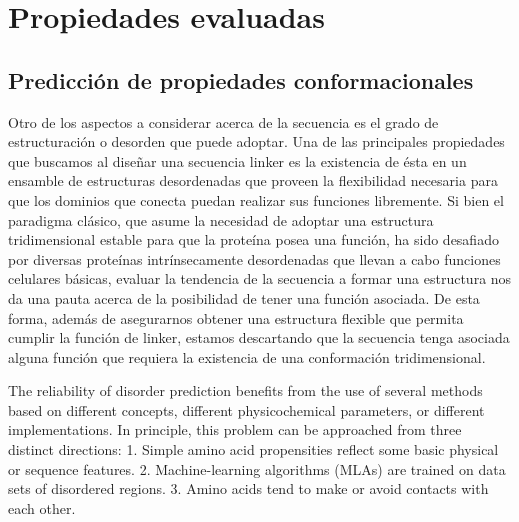 \chapter{Propiedades evaluadas}
\label{tools}

\section{Predicción de propiedades conformacionales} \label{propiedadesConformacionales}






Otro de los aspectos a considerar acerca de la secuencia es el grado de estructuración o desorden que puede adoptar. 
Una de las principales propiedades que buscamos al diseñar una secuencia linker es la existencia de ésta en un ensamble
de estructuras desordenadas que proveen la flexibilidad necesaria para que los dominios que conecta puedan realizar sus funciones libremente.
Si bien el paradigma clásico, que asume la necesidad de adoptar una estructura tridimensional estable para que la proteína posea una función,
ha sido desafiado por diversas proteínas intrínsecamente desordenadas que llevan a cabo funciones celulares básicas, 
evaluar la tendencia de la secuencia a formar una estructura nos da una pauta acerca de la posibilidad de tener una función asociada. 
De esta forma, además de asegurarnos obtener una estructura flexible que permita cumplir la función de linker, 
estamos descartando que la secuencia tenga asociada alguna función que requiera la existencia de una conformación tridimensional.

The reliability of disorder prediction benefits from the use of several
methods based on different concepts, different physicochemical
parameters, or different implementations. In principle, this
problem can be approached from three distinct directions:
1. Simple amino acid propensities reflect some basic physical
or sequence features.
2. Machine-learning algorithms (MLAs) are trained on data
sets of disordered regions.
3. Amino acids tend to make or avoid contacts with each other.

